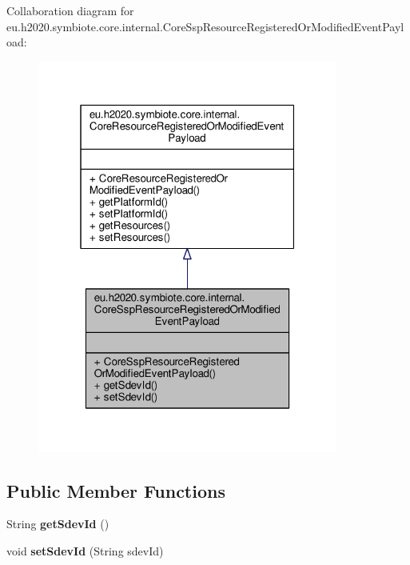 Collaboration diagram for eu.\+h2020.\+symbiote.\+core.\+internal.\+Core\+Ssp\+Resource\+Registered\+Or\+Modified\+Event\+Payload\+:\nopagebreak
\begin{figure}[H]
\begin{center}
\leavevmode
\includegraphics[width=280pt]{classeu_1_1h2020_1_1symbiote_1_1core_1_1internal_1_1CoreSspResourceRegisteredOrModifiedEventPayload__coll__graph}
\end{center}
\end{figure}
\subsection*{Public Member Functions}
\begin{DoxyCompactItemize}
\item 
\mbox{\label{classeu_1_1h2020_1_1symbiote_1_1core_1_1internal_1_1CoreSspResourceRegisteredOrModifiedEventPayload_a07d4e228ab28a33baeac0cd527191b1f}} 
String {\bfseries get\+Sdev\+Id} ()
\item 
\mbox{\label{classeu_1_1h2020_1_1symbiote_1_1core_1_1internal_1_1CoreSspResourceRegisteredOrModifiedEventPayload_a7a50f739df0bf5cce881ca0873ee239d}} 
void {\bfseries set\+Sdev\+Id} (String sdev\+Id)
\end{DoxyCompactItemize}



